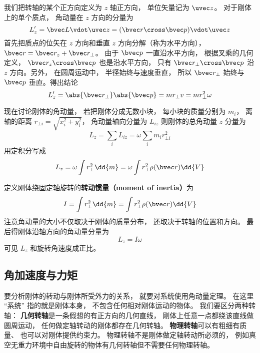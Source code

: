 我们把转轴的某个正方向定义为 $z$ 轴正方向， 单位矢量记为 $\uvec z$。 对于刚体上的单个质点， 角动量在 $z$ 方向的分量为
\begin{equation}
L'_{z} = \bvec L \vdot \uvec z = (\bvec r \cross \bvec p) \vdot \uvec z
\end{equation}
首先把质点的位矢在 $z$ 方向和垂直 $z$ 方向分解（称为水平方向）， $\bvec r = \bvec r_z + \bvec r_ \bot$。 由于 $\bvec p$ 一直沿水平方向， 根据叉乘的几何定义， $\bvec r_z \cross \bvec p$ 也是沿水平方向， 只有 $\bvec r_ \bot \cross \bvec p$ 沿 $z$ 方向。另外， 在圆周运动中， 半径始终与速度垂直， 所以 $\bvec r_ \bot$ 始终与 $\bvec p$ 垂直。得出结论
\begin{equation}
L'_z = \abs{\bvec r_\bot} \abs{\bvec p} = m r_ \bot v = mr_ \bot ^2\omega 
\end{equation}

现在讨论刚体的角动量， 若把刚体分成无数小块， 每小块的质量分别为 $m_i$， 离轴的距离 $r_{\bot i} = \sqrt{x_i^2 + y_i^2} $， 角动量轴向分量为 $L_{iz}$ 则刚体的总角动量 $z$ 分量为
\begin{equation}
L_z = \sum_i L_{iz} = \omega \sum_i m_i r_{ \bot i}^2
\end{equation}
用定积分写成
\begin{equation}
L_z = \omega \int r_ \bot ^2 \dd{m} = \omega \int r_ \bot ^2\rho(\bvec r)  \dd{V} 
\end{equation}

定义刚体绕固定轴旋转的\textbf{转动惯量（moment of inertia）}为
\begin{equation}
I = \int r_ \bot ^2 \dd{m} = \int r_ \bot ^2\rho(\bvec r) \dd{V} 
\end{equation}
注意角动量的大小不仅取决于刚体的质量分布， 还取决于转轴的位置和方向。 最后得刚体沿轴方向的角动量分量为
\begin{equation}\label{RigRot_eq5}
L_z = I \omega 
\end{equation}
可见 $L_z$ 和旋转角速度成正比。

\subsection{角加速度与力矩}
要分析刚体的转动与刚体所受外力的关系， 就要对系统使用角动量定理。 在这里 “系统” 指的就是刚体本身， 不包含任何相对刚体运动的物体。 我们要区分两种转轴： \textbf{几何转轴}是一条假想的有正方向的几何直线， 刚体上任意一点都绕该直线做圆周运动， 任何做定轴转动的刚体都存在几何转轴。 \textbf{物理转轴}可以有粗细有质量、 也可以对刚体提供约束力。 物理转轴不是刚体做定轴转动所必须的， 例如真空无重力环境中自由旋转的物体有几何转轴但不需要任何物理转轴。

